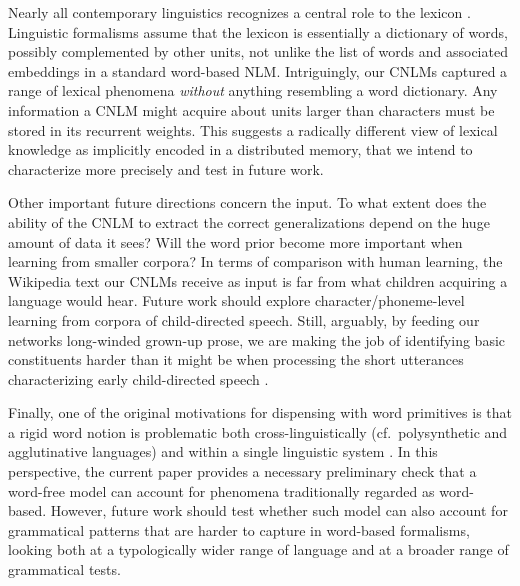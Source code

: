 Nearly all contemporary linguistics recognizes a central role to the
lexicon \cite[see, e.g.,][for very different
perspectives]{Sag:etal:2003,Goldberg:2005,Radford:2006,Bresnan:etal:2016,Jezek:2016}. Linguistic
formalisms assume that the lexicon is essentially a dictionary
of words, possibly complemented by other units, not unlike the list of
words and associated embeddings in a standard word-based
NLM. Intriguingly, our CNLMs captured a range of lexical phenomena
\emph{without} anything resembling a word dictionary. Any information
a CNLM might acquire about units larger than characters must be stored
in its recurrent weights. This suggests a radically different view of
lexical knowledge as implicitly encoded in a distributed memory, that
we intend to characterize more precisely and test in future work.

Other important future directions concern the input. To what extent
does the ability of the CNLM to extract the correct generalizations
depend on the huge amount of data it sees?  Will the word prior
become more important when learning from smaller corpora? In
terms of  comparison with human learning, the Wikipedia text our
CNLMs receive as input is far from what children acquiring a
language would hear. Future work should explore
character/phoneme-level learning from corpora of child-directed
speech. Still, arguably, by feeding our networks long-winded grown-up
prose, we are making the job of identifying basic constituents harder
than it might be when processing the short utterances characterizing
early child-directed speech \cite{Tomasello:2003}.

Finally, one of the original motivations for dispensing with word
primitives is that a rigid word notion is problematic both
cross-linguistically (cf.~polysynthetic and agglutinative languages)
and within a single linguistic system \cite[cf.~the common view that
the lexicon hosts units at different levels of the linguistic
hierarchy, from morphemes to large syntactic constructions,
e.g.,][]{Jackendoff:1997,Croft:Cruse:2004,Goldberg:2005}. In this
perspective, the current paper provides a necessary preliminary check
that a word-free model can account for phenomena traditionally
regarded as word-based. However, future work should  test
whether such model can also account for grammatical patterns that are
harder to capture in word-based formalisms, looking
both at a typologically wider range of language and at a broader range
of grammatical tests.






